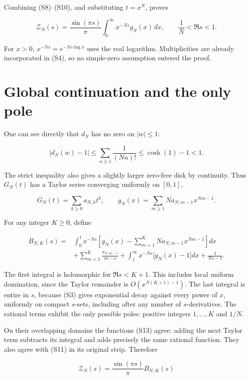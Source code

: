 Combining (S8)--(S10), and substituting \(t=x^N\), proves

\[
\boxed{\mathcal Z_N(s)=\frac{\sin(\pi s)}{\pi}
\int_0^\infty x^{-Ns}g_N(x)\,dx,
\qquad \frac1N<\Re s<1.}
\tag{S11}
\]

For \(x>0\), \(x^{-Ns}=e^{-Ns\log x}\) uses the real logarithm.
Multiplicities are already incorporated in (S4), so no simple-zero
assumption entered the proof.

\hypertarget{global-continuation-and-the-only-pole}{%
\section{Global continuation and the only
pole}\label{global-continuation-and-the-only-pole}}

One can see directly that \(d_N\) has no zero on \(|w|\le1\):

\[
|d_N(w)-1|\le\sum_{n\ge1}\frac1{(Nn)!}
\le\cosh(1)-1<1.
\]

The strict inequality also gives a slightly larger zero-free disk by
continuity. Thus \(G_N(t)\) has a Taylor series converging uniformly on
\([0,1]\),

\[
G_N(t)=\sum_{k\ge0}a_{N,k}t^k,
\qquad g_N(x)=\sum_{m\ge1}N a_{N,m-1}x^{Nm-1}.
\tag{S12}
\]

For any integer \(K\ge0\), define

\[
\begin{aligned}
B_{N,K}(s)={}&
\int_0^1x^{-Ns}\left[g_N(x)-\sum_{m=1}^{K}N a_{N,m-1}x^{Nm-1}\right]dx\\
&+\sum_{m=1}^{K}\frac{a_{N,m-1}}{m-s}
 +\int_1^\infty x^{-Ns}\bigl[g_N(x)-1\bigr]dx
 +\frac1{Ns-1}.
\end{aligned}
\tag{S13}
\]

The first integral is holomorphic for \(\Re s<K+1\). This includes local
uniform domination, since the Taylor remainder is \(O(x^{N(K+1)-1})\).
The last integral is entire in \(s\), because (S3) gives exponential
decay against every power of \(x\), uniformly on compact \(s\)-sets,
including after any number of \(s\)-derivatives. The rational terms
exhibit the only possible poles: positive integers \(1,\ldots,K\) and
\(1/N\).

On their overlapping domains the functions (S13) agree: adding the next
Taylor term subtracts its integral and adds precisely the same rational
function. They also agree with (S11) in its original strip. Therefore

\[
\mathcal Z_N(s)=\frac{\sin(\pi s)}{\pi}B_{N,K}(s)
\tag{S14}
\]

